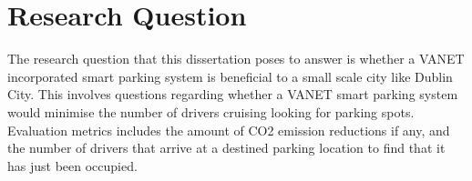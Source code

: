 \section{Research Question}
The research question that this dissertation poses to answer is whether a \ac{VANET} incorporated smart parking system is beneficial to a small scale city like Dublin City. This involves questions regarding whether a \ac{VANET} smart parking system would minimise the number of drivers cruising looking for parking spots. Evaluation metrics includes the amount of CO2 emission reductions if any, and the number of drivers that arrive at a destined parking location to find that it has just been occupied.